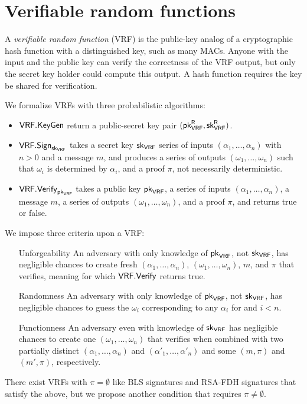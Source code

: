 \section{Verifiable random functions}

A {\em verifiable random function} (VRF) is the public-key analog of a cryptographic hash function with a distinguished key, such as many MACs.  Anyone with the input and the public key can verify the correctness of the VRF output, but only the secret key holder could compute this output.  A hash function requires the key be shared for verification. 

We formalize VRFs with three probabilistic algorithms: 
\begin{itemize}
\item $\mathsf{VRF}.\mathsf{KeyGen}$ return a public-secret key pair $(\mathsf{pk}_{\mathsf{VRF}}^{\mathsf{R}},\mathsf{sk}_{\mathsf{VRF}}^{\mathsf{R}})$.
\item $\mathsf{VRF}.\mathsf{Sign}_{\mathsf{sk}_{\mathsf{VRF}}}$ takes a secret key $\mathsf{sk}_{\mathsf{VRF}}$ series of inputs $(\alpha_1,\ldots,\alpha_n)$ with $n>0$ and a message $m$, and produces a series of outputs $(\omega_1,\ldots,\omega_n)$ such that $\omega_i$ is determined by $\alpha_i$, and a proof $\pi$, not necessarily deterministic.
\item $\mathsf{VRF}.\mathsf{Verify}_{\mathsf{pk}_{\mathsf{VRF}}}$ takes a public key $\mathsf{pk}_{\mathsf{VRF}}$, a series of inputs $(\alpha_1,\ldots,\alpha_n)$, a message $m$, a series of outputs $(\omega_1,\ldots,\omega_n)$, and a proof $\pi$, and returns true or false.
\end{itemize}
We impose three criteria upon a VRF:
\begin{enumerate}
\item[Unforgeability] An adversary with only knowledge of $\mathsf{pk}_{\mathsf{VRF}}$, not $\mathsf{sk}_{\mathsf{VRF}}$, has negligible chances to create fresh $(\alpha_1,\ldots,\alpha_n)$, $(\omega_1,\ldots,\omega_n)$, $m$, and $\pi$ that verifies, meaning for which $\mathsf{VRF}.\mathsf{Verify}$ returns true.
\item[Randomness] An adversary with only knowledge of $\mathsf{pk}_{\mathsf{VRF}}$, not $\mathsf{sk}_{\mathsf{VRF}}$, has negligible chances to guess the $\omega_i$ corresponding to any $\alpha_i$ for and $i<n$.
\item[Functionness] An adversary even with knowledge of $\mathsf{sk}_{\mathsf{VRF}}$ has negligible chances to create one $(\omega_1,\ldots,\omega_n)$ that verifies when combined with two partially distinct $(\alpha_1,\ldots,\alpha_n)$ and $(\alpha'_1,\ldots,\alpha'_n)$ and some $(m,\pi)$ and $(m',\pi)$, respectively.
\end{enumerate}
There exist VRFs with $\pi = \emptyset$ like BLS signatures and RSA-FDH signatures that satisfy the above, but we propose another condition that requires $\pi \ne \emptyset$.
